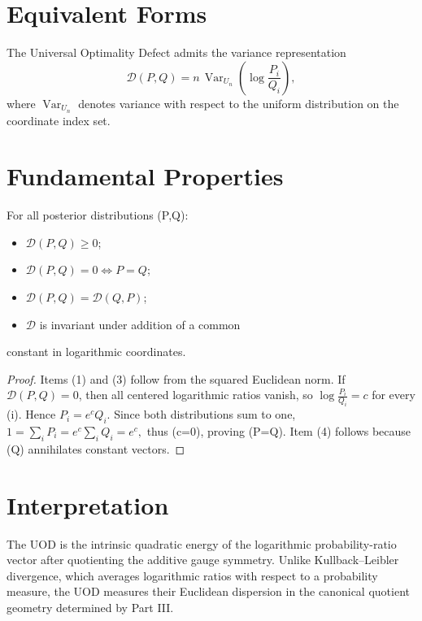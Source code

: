 \section{Equivalent Forms}
\begin{corollary}
\label{ch:cor:21-3}
The Universal Optimality Defect admits the variance representation
\[ \boxed{
\mathcal{D}(P,Q)
=
n\,
\operatorname{Var}_{U_n}
\!\left(
\log\frac{P_i}{Q_i}
\right),
} \]
where \(\operatorname{Var}_{U_n}\) denotes variance with respect
to the uniform distribution on the coordinate index set.
\end{corollary}
\section{Fundamental Properties}
\begin{proposition}
\label{ch:prop:21-4}
For all posterior distributions (P,Q):
\begin{itemize}
  \item \(\mathcal{D}(P,Q)\ge0\);
  \item \(\mathcal{D}(P,Q)=0\iff P=Q\);
  \item \(\mathcal{D}(P,Q)=\mathcal{D}(Q,P)\);
  \item \(\mathcal{D}\) is invariant under addition of a common
\end{itemize}
    constant in logarithmic coordinates.
\begin{proof}
Items (1) and (3) follow from the squared Euclidean norm.
If \(\mathcal{D}(P,Q)=0\), then all centered logarithmic ratios
vanish, so
$\log\frac{P_i}{Q_i}=c$
for every (i). Hence \(P_i=e^{c}Q_i\). Since both distributions sum to one,
$1=\sum_{i}P_i=e^{c}\sum_{i}Q_i=e^{c},$
thus (c=0), proving (P=Q).
Item (4) follows because (Q) annihilates constant vectors.
\end{proof}
\end{proposition}
\section{Interpretation}
The UOD is the intrinsic quadratic energy of the logarithmic
probability-ratio vector after quotienting the additive gauge symmetry.
Unlike Kullback--Leibler divergence, which averages logarithmic ratios
with respect to a probability measure, the UOD measures their Euclidean
dispersion in the canonical quotient geometry determined by Part III.
